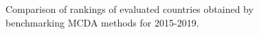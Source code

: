 \documentclass[5p,times]{elsarticle}
\begin{document}
%
\begin{figure}[H]
\centering
\quad
{}
\quad
{}
\caption{Comparison of rankings of evaluated countries obtained by benchmarking MCDA methods for 2015-2019.}
\label{fig:radars}
\end{figure}
%
%
\end{document}
